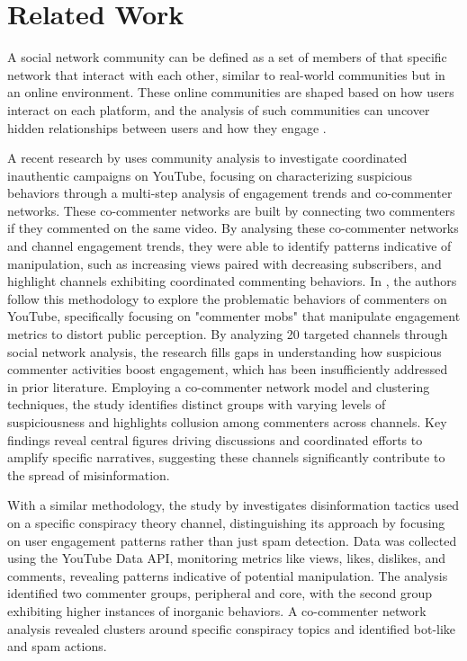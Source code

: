 \documentclass[sigconf]{acmart}
\begin{document}
\section{Related Work}

A social network community can be defined as a set of members of that specific network that interact
with each other, similar to real-world communities but in an online environment.
These online communities are shaped based on how users interact on each platform, and the analysis
of such communities can uncover hidden relationships between users and how they engage \cite{nooribakhsh2024community}.

A recent research by \cite{kirdemir2023} uses community analysis to investigate coordinated 
inauthentic campaigns on YouTube, focusing on characterizing suspicious behaviors through a 
multi-step analysis of engagement trends and co-commenter networks. These co-commenter networks are
built by connecting two commenters if they commented on the same video.
By analysing these co-commenter networks and channel engagement trends, they were able to identify
patterns indicative of manipulation, such as increasing views paired with decreasing subscribers, 
and highlight channels exhibiting coordinated 
commenting behaviors. In \cite{shajari2023}, the authors follow this methodology to
explore the problematic behaviors of commenters on YouTube, specifically focusing on "commenter mobs" 
that manipulate engagement metrics to distort public perception. 
By analyzing 20 targeted channels through social network analysis, the research fills gaps in 
understanding how suspicious commenter activities boost engagement, which has been insufficiently 
addressed in prior literature. Employing a co-commenter network model and clustering techniques, 
the study identifies distinct groups with varying levels of suspiciousness and highlights collusion 
among commenters across channels. Key findings reveal central figures driving discussions and 
coordinated efforts to amplify specific narratives, suggesting these channels significantly contribute 
to the spread of misinformation. 

With a similar methodology, the study by \cite{hussain2018analyzing} investigates
disinformation tactics used on a specific conspiracy theory channel, distinguishing its approach by 
focusing on user engagement patterns rather than just spam detection. Data was collected using the 
YouTube Data API, monitoring metrics like views, likes, dislikes, and comments, revealing patterns 
indicative of potential manipulation. The analysis identified two commenter groups, peripheral and 
core, with the second group exhibiting higher instances of inorganic behaviors. A co-commenter network 
analysis revealed clusters around specific conspiracy topics and identified bot-like and spam actions. 
\end{document}
